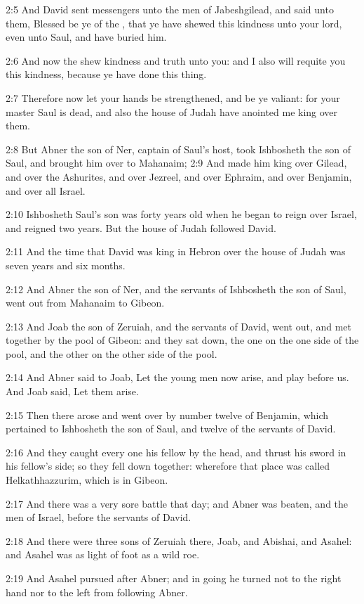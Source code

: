 2:5 And David sent messengers unto the men of Jabeshgilead, and said unto them, Blessed be ye of the \LORD, that ye have shewed this kindness unto your lord, even unto Saul, and have buried him.

2:6 And now the \LORD shew kindness and truth unto you: and I also will requite you this kindness, because ye have done this thing.

2:7 Therefore now let your hands be strengthened, and be ye valiant: for your master Saul is dead, and also the house of Judah have anointed me king over them.

2:8 But Abner the son of Ner, captain of Saul's host, took Ishbosheth the son of Saul, and brought him over to Mahanaim; 2:9 And made him king over Gilead, and over the Ashurites, and over Jezreel, and over Ephraim, and over Benjamin, and over all Israel.

2:10 Ishbosheth Saul's son was forty years old when he began to reign over Israel, and reigned two years. But the house of Judah followed David.

2:11 And the time that David was king in Hebron over the house of Judah was seven years and six months.

2:12 And Abner the son of Ner, and the servants of Ishbosheth the son of Saul, went out from Mahanaim to Gibeon.

2:13 And Joab the son of Zeruiah, and the servants of David, went out, and met together by the pool of Gibeon: and they sat down, the one on the one side of the pool, and the other on the other side of the pool.

2:14 And Abner said to Joab, Let the young men now arise, and play before us. And Joab said, Let them arise.

2:15 Then there arose and went over by number twelve of Benjamin, which pertained to Ishbosheth the son of Saul, and twelve of the servants of David.

2:16 And they caught every one his fellow by the head, and thrust his sword in his fellow's side; so they fell down together: wherefore that place was called Helkathhazzurim, which is in Gibeon.

2:17 And there was a very sore battle that day; and Abner was beaten, and the men of Israel, before the servants of David.

2:18 And there were three sons of Zeruiah there, Joab, and Abishai, and Asahel: and Asahel was as light of foot as a wild roe.

2:19 And Asahel pursued after Abner; and in going he turned not to the right hand nor to the left from following Abner.

